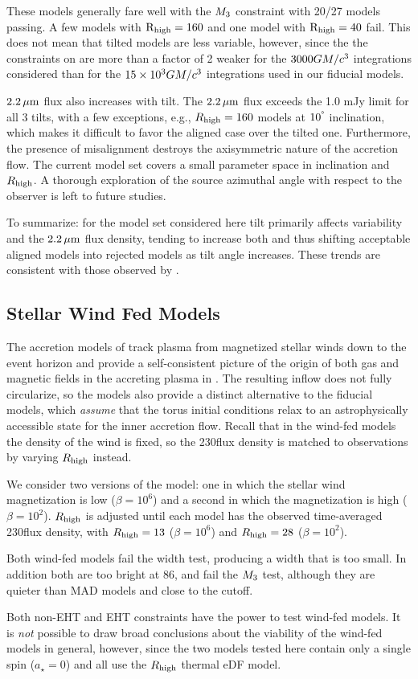 These models generally fare well with the $M_{3}$ constraint with 20/27 models passing.
A few models with $\rm R_{high}=160$ and one model with $\rm R_{high}=40$ fail.
This does not mean that tilted models are less variable, however, since the the constraints on  are more than a factor of 2 weaker for the $3000GM/c^3$ integrations considered than for the $15 \times 10^3GM/c^3$ integrations used in our fiducial models.

$2.2\,\mu\mathrm{m}$ flux also increases with tilt.
The $2.2\,\mu\mathrm{m}$ flux exceeds the 1.0 mJy limit for all 3 tilts, with a few exceptions, e.g., $R_{\rm high}=160$ models at $10^{\degree}$ inclination, which makes it difficult to favor the aligned case over the tilted one.
Furthermore, the presence of misalignment destroys the axisymmetric nature of the accretion flow.
The current model set covers a small parameter space in inclination and $R_{\rm high}$.
A thorough exploration of the source azimuthal angle with respect to the observer is left to future studies.

To summarize: for the model set considered here tilt primarily affects variability and the $2.2\,\mu\mathrm{m}$ flux density, tending to increase both and thus shifting acceptable aligned models into rejected models as tilt angle increases.
These trends are consistent with those observed by \cite{2021arXiv210412896W}.

\subsection{Stellar Wind Fed Models}

The accretion models of \cite{2020ApJ...896L...6R, 2020MNRAS.492.3272R, 2018MNRAS.478.3544R} track plasma from  magnetized stellar winds down to the event horizon and provide a self-consistent picture of the origin of both gas and magnetic fields in the accreting plasma in \sgra.
The resulting inflow does not fully circularize, so the models also provide a distinct alternative to the fiducial models, which {\em assume} that the torus initial conditions relax to an astrophysically accessible state for the inner accretion flow.
Recall that in the wind-fed models the density of the wind is fixed, so the 230\GHz flux density is matched to observations by varying $R_\mathrm{high}$ instead.

We consider two versions of the model: one in which the stellar wind magnetization is low ($\beta = 10^6$) and a second in which the magnetization is high ($\beta = 10^2$).
$R_\mathrm{high}$ is adjusted until each model has the observed time-averaged 230\GHz flux density, with $R_\mathrm{high} = 13$ ($\beta = 10^6$) and $R_\mathrm{high} = 28$ ($\beta = 10^2$).

Both wind-fed models fail the \mring width test, producing a width that is too small.
In addition both are too bright at 86\GHz, and fail the $M_{3}$ test, although they are quieter than MAD models and close to the cutoff.

Both non-EHT and EHT constraints have the power to test wind-fed models.
It is {\em not} possible to draw broad conclusions about the viability of the wind-fed models in general, however, since the two models tested here contain only a single spin ($a_\star=0$) and all use the $R_\mathrm{high}$ thermal eDF model.
